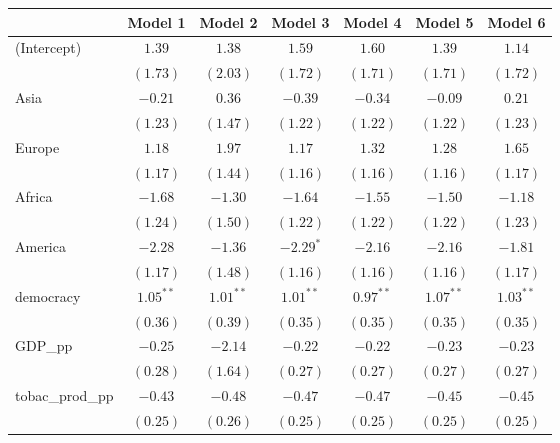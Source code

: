 
\begin{table}[!h]
\begin{center}
\begin{tabular}{l c c c c c c }
\toprule
 & Model 1 & Model 2 & Model 3 & Model 4 & Model 5 & Model 6 \\
\midrule
(Intercept)             & $1.39$      & $1.38$      & $1.59$      & $1.60$      & $1.39$      & $1.14$      \\
                        & $(1.73)$    & $(2.03)$    & $(1.72)$    & $(1.71)$    & $(1.71)$    & $(1.72)$    \\
Asia                    & $-0.21$     & $0.36$      & $-0.39$     & $-0.34$     & $-0.09$     & $0.21$      \\
                        & $(1.23)$    & $(1.47)$    & $(1.22)$    & $(1.22)$    & $(1.22)$    & $(1.23)$    \\
Europe                  & $1.18$      & $1.97$      & $1.17$      & $1.32$      & $1.28$      & $1.65$      \\
                        & $(1.17)$    & $(1.44)$    & $(1.16)$    & $(1.16)$    & $(1.16)$    & $(1.17)$    \\
Africa                  & $-1.68$     & $-1.30$     & $-1.64$     & $-1.55$     & $-1.50$     & $-1.18$     \\
                        & $(1.24)$    & $(1.50)$    & $(1.22)$    & $(1.22)$    & $(1.22)$    & $(1.23)$    \\
America                 & $-2.28$     & $-1.36$     & $-2.29^{*}$ & $-2.16$     & $-2.16$     & $-1.81$     \\
                        & $(1.17)$    & $(1.48)$    & $(1.16)$    & $(1.16)$    & $(1.16)$    & $(1.17)$    \\
democracy               & $1.05^{**}$ & $1.01^{**}$ & $1.01^{**}$ & $0.97^{**}$ & $1.07^{**}$ & $1.03^{**}$ \\
                        & $(0.36)$    & $(0.39)$    & $(0.35)$    & $(0.35)$    & $(0.35)$    & $(0.35)$    \\
GDP\_pp                 & $-0.25$     & $-2.14$     & $-0.22$     & $-0.22$     & $-0.23$     & $-0.23$     \\
                        & $(0.28)$    & $(1.64)$    & $(0.27)$    & $(0.27)$    & $(0.27)$    & $(0.27)$    \\
tobac\_prod\_pp         & $-0.43$     & $-0.48$     & $-0.47$     & $-0.47$     & $-0.45$     & $-0.45$     \\
                        & $(0.25)$    & $(0.26)$    & $(0.25)$    & $(0.25)$    & $(0.25)$    & $(0.25)$    \\

\end{tabular}
\end{center}
\end{table}
